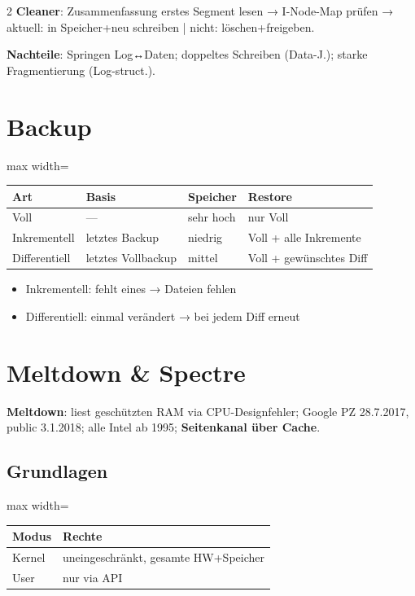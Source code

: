 \documentclass[10pt, a4paper]{article}
\begin{document}
\begin{multicols}{2}
\textbf{Cleaner}: Zusammenfassung erstes Segment lesen → I-Node-Map prüfen → aktuell: in Speicher+neu schreiben | nicht: löschen+freigeben.


\textbf{Nachteile}: Springen Log↔Daten; doppeltes Schreiben (Data-J.); starke Fragmentierung (Log-struct.).



\section{Backup}


{\small
\begin{adjustbox}{max width=\linewidth}
{\scriptsize
\begin{tabular}{llll}
\toprule
\textbf{Art} & \textbf{Basis} & \textbf{Speicher} & \textbf{Restore} \\
\midrule
Voll & — & sehr hoch & nur Voll \\
Inkrementell & letztes Backup & niedrig & Voll + alle Inkremente \\
Differentiell & letztes Vollbackup & mittel & Voll + gewünschtes Diff \\
\bottomrule
\end{tabular}
}
\end{adjustbox}
}


\begin{itemize}
  \item Inkrementell: fehlt eines → Dateien fehlen
  \item Differentiell: einmal verändert → bei jedem Diff erneut
\end{itemize}


\section{Meltdown \& Spectre}

\textbf{Meltdown}: liest geschützten RAM via CPU-Designfehler; Google PZ 28.7.2017, public 3.1.2018; alle Intel ab 1995; \textbf{Seitenkanal über Cache}.



\subsection{Grundlagen}


{\small
\begin{adjustbox}{max width=\linewidth}
{\scriptsize
\begin{tabular}{ll}
\toprule
\textbf{Modus} & \textbf{Rechte} \\
\midrule
Kernel & uneingeschränkt, gesamte HW+Speicher \\
User & nur via API \\
\bottomrule
\end{tabular}
}
\end{adjustbox}
}



\end{multicols}
\end{document}
